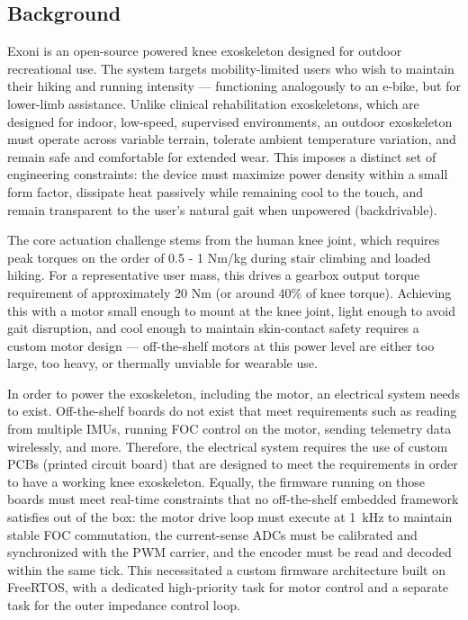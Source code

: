 \documentclass[11pt]{article}
\begin{document}
\subsection{Background}
Exoni is an open-source powered knee exoskeleton designed for outdoor recreational use. The system targets mobility-limited users who wish to maintain their hiking and running intensity — functioning analogously to an e-bike, but for lower-limb assistance. Unlike clinical rehabilitation exoskeletons, which are designed for indoor, low-speed, supervised environments, an outdoor exoskeleton must operate across variable terrain, tolerate ambient temperature variation, and remain safe and comfortable for extended wear. This imposes a distinct set of engineering constraints: the device must maximize power density within a small form factor, dissipate heat passively while remaining cool to the touch, and remain transparent to the user's natural gait when unpowered (backdrivable).

The core actuation challenge stems from the human knee joint, which requires peak torques on the order of 0.5 - 1 Nm/kg during stair climbing and loaded hiking. For a representative user mass, this drives a gearbox output torque requirement of approximately 20 Nm (or around 40\% of knee torque). Achieving this with a motor small enough to mount at the knee joint, light enough to avoid gait disruption, and cool enough to maintain skin-contact safety requires a custom motor design — off-the-shelf motors at this power level are either too large, too heavy, or thermally unviable for wearable use.

In order to power the exoskeleton, including the motor, an electrical system needs to exist. Off-the-shelf boards do not exist that meet requirements such as reading from multiple IMUs, running FOC control on the motor, sending telemetry data wirelessly, and more. Therefore, the electrical system requires the use of custom PCBs (printed circuit board) that are designed to meet the requirements in order to have a working knee exoskeleton. Equally, the firmware running on those boards must meet real-time constraints that no off-the-shelf embedded framework satisfies out of the box: the motor drive loop must execute at 1~kHz to maintain stable FOC commutation, the current-sense ADCs must be calibrated and synchronized with the PWM carrier, and the encoder must be read and decoded within the same tick. This necessitated a custom firmware architecture built on FreeRTOS, with a dedicated high-priority task for motor control and a separate task for the outer impedance control loop.
\end{document}
